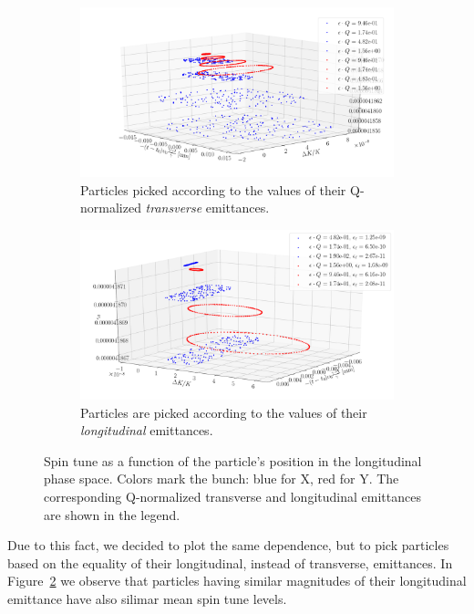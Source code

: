 \begin{figure}[h]
  \centering
  \begin{subfigure}{\linewidth}
    \includegraphics[height=.3\paperheight]{images/stune_traj_equ/part2/3D_plot_all_ps_vars}
    \caption{Particles picked according to the values of their Q-normalized \emph{transverse}
    emittances.\label{fig:main:all_ps}}
  \end{subfigure}
  \begin{subfigure}{\linewidth}
    \includegraphics[height=.3\paperheight]{images/stune_traj_equ/part2/3D_plot_all_ps_vars_equal_long_emi}
    \caption{Particles are picked according to the values of their \emph{longitudinal}
    emittances.\label{fig:main:gamma_eff}}
  \end{subfigure}
  \caption{Spin tune as a function of the particle's position in the longitudinal phase space.
    Colors mark the bunch: blue for X, red for Y. The corresponding Q-normalized transverse and
    longitudinal emittances are shown in the legend.\label{fig:main}}
\end{figure}

Due to this fact, we decided to plot the same dependence, but to pick particles based on the equality of
their longitudinal, instead of transverse, emittances. In Figure~\ref{fig:main:gamma_eff} we observe that
particles having similar magnitudes of their longitudinal emittance have also silimar mean spin tune levels.

